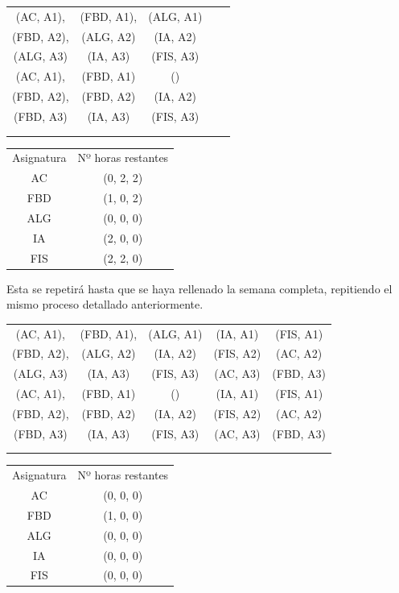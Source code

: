 \begin{minipage}{0.7\textwidth}    
\begin{tabular}{| c | c | c | c | c |}
\hline
 (AC, A1), & (FBD, A1), & (ALG, A1) &  & \\
 (FBD, A2), & (ALG, A2) & (IA, A2) &  & \\
 (ALG, A3) &  (IA, A3) & (FIS, A3) &  & \\
 \hline
 (AC, A1), & (FBD, A1) & () &  & \\
 (FBD, A2), & (FBD, A2) & (IA, A2) &  & \\
 (FBD, A3) & (IA, A3) & (FIS, A3) &  & \\
 \hline
 &  &  &  & \\
 \hline
 &  &  &  & \\
 \hline 
\end{tabular}
\end{minipage}
\begin{minipage}{0.8\textwidth}
\begin{tabular}{c | c}
Asignatura & Nº horas restantes \\
AC & (0, 2, 2) \\
FBD & (1, 0, 2) \\
ALG & (0, 0, 0) \\
IA & (2, 0, 0) \\
FIS & (2, 2, 0)
\end{tabular}
\end{minipage}

Esta se repetirá hasta que se haya rellenado la semana completa, repitiendo el mismo proceso detallado anteriormente. 

\begin{minipage}{0.8\textwidth}    
\begin{tabular}{| c | c | c | c | c |}
\hline
 (AC, A1), & (FBD, A1), & (ALG, A1) & (IA, A1) & (FIS, A1) \\
 (FBD, A2), & (ALG, A2) & (IA, A2) & (FIS, A2) & (AC, A2) \\
 (ALG, A3) &  (IA, A3) & (FIS, A3) & (AC, A3) & (FBD, A3) \\
 \hline
 (AC, A1), & (FBD, A1) & () & (IA, A1) & (FIS, A1) \\
 (FBD, A2), & (FBD, A2) & (IA, A2) & (FIS, A2) & (AC, A2) \\
 (FBD, A3) & (IA, A3) & (FIS, A3) & (AC, A3) & (FBD, A3) \\
 \hline
 &  &  &  & \\
 \hline
 &  &  &  & \\
 \hline 
\end{tabular}
\end{minipage}
\begin{minipage}{1\textwidth}
\begin{tabular}{c | c}
Asignatura & Nº horas restantes \\
AC & (0, 0, 0) \\
FBD & (1, 0, 0) \\
ALG & (0, 0, 0) \\
IA & (0, 0, 0) \\
FIS & (0, 0, 0)
\end{tabular}
\end{minipage}

